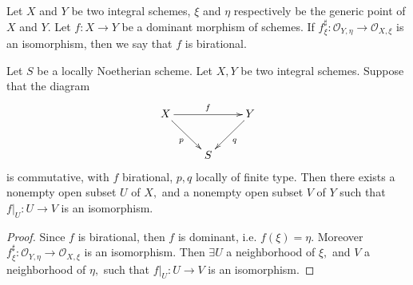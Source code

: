 \begin{Def}
Let $X$ and $Y$ be two integral schemes, $\xi$ and $\eta$
respectively  be the generic point of $X$ and $Y.$ Let $f:
X\rightarrow Y$ be a dominant morphism of schemes. If
$f^{\sharp}_{\xi}: \mathcal {O}_{Y,\eta}\rightarrow\mathcal
{O}_{X,\xi}$ is an isomorphism, then we say that $f$ is birational.
\end{Def}
\begin{prop}
Let $S$ be a locally Noetherian scheme. Let $X, Y$ be two integral
schemes. Suppose that the diagram
\[ \xymatrix{
   X \ar[rr]^f \ar[dr]_p & & Y \ar[dl]^q \\
   & S }  \]
is commutative, with $f$ birational, $p, q$ locally of finite type.
Then there exists a nonempty open subset $U$ of $X,$ and a nonempty
open subset $V$ of $Y$ such that $\left.f\right|_U: U\rightarrow V$
is an isomorphism.
\end{prop}
\begin{proof}
Since $f$ is birational, then $f$ is dominant, i.e. $f(\xi)=\eta.$
Moreover $f^{\sharp}_{\xi}: \mathcal {O}_{Y,\eta}\rightarrow\mathcal
{O}_{X,\xi}$ is an isomorphism. Then $\exists U$ a neighborhood of
$\xi,$ and $V$ a neighborhood of $\eta,$ such that
$\left.f\right|_U: U\rightarrow V$ is an isomorphism.
\end{proof}
